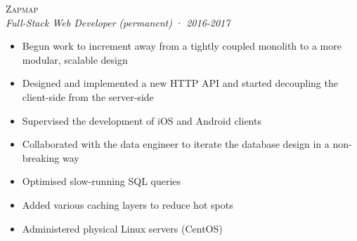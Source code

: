 \documentclass[a4paper,10pt]{article}
\newcommand{\resumeSubheading}[5][12pt]{
  \vspace{#1}
  {\scshape{#2}} \\
  \textit{\small{#3}} \textit{\small{(#4)}} · \textit{\small{#5}}
  \vspace{2pt}
}
\newcommand{\resumeListStart}{\begin{itemize}}
\newcommand{\resumeListEnd}{\end{itemize}}
\newcommand{\resumeItem}[1]{
  \item[\-·]\small{{#1\vspace{1pt}}}
}
\begin{document}
  \begin{minipage}{\textwidth}
    \resumeSubheading
      {Zapmap}
      {Full-Stack Web Developer}
      {permanent}
      {2016-2017}
    \resumeListStart
      \resumeItem{Begun work to increment away from a tightly coupled monolith to a more modular, scalable design}
      \resumeItem{Designed and implemented a new HTTP API and started decoupling the client-side from the server-side}
      \resumeItem{Supervised the development of iOS and Android clients}
      \resumeItem{Collaborated with the data engineer to iterate the database design in a non-breaking way}
      \resumeItem{Optimised slow-running SQL queries}
      \resumeItem{Added various caching layers to reduce hot spots}
      \resumeItem{Administered physical Linux servers (CentOS)}
    \resumeListEnd
  \end{minipage}

\end{document}
